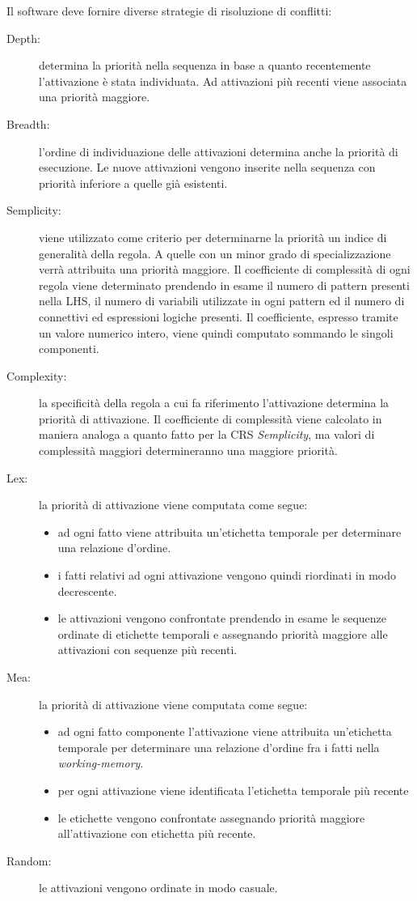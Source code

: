 Il software deve fornire diverse strategie di risoluzione di conflitti:
\begin{description}
	\item[Depth:] determina la priorità nella sequenza in base a quanto recentemente l'attivazione è stata individuata. Ad attivazioni più recenti viene associata una priorità maggiore.
	\item[Breadth:] l'ordine di individuazione delle attivazioni determina anche la priorità di esecuzione. Le nuove attivazioni vengono inserite nella sequenza con priorità inferiore a quelle già esistenti.
	\item[Semplicity:] viene utilizzato come criterio per determinarne la priorità un indice di generalità della regola. A quelle con un minor grado di specializzazione verrà attribuita una priorità maggiore. Il coefficiente di complessità di ogni regola viene determinato prendendo in esame il numero di pattern presenti nella LHS, il numero di variabili utilizzate in ogni pattern ed il numero di connettivi ed espressioni logiche presenti. Il coefficiente, espresso tramite un valore numerico intero, viene quindi computato sommando le singoli componenti.
	\item[Complexity:] la specificità della regola a cui fa riferimento l'attivazione determina la priorità di attivazione. Il coefficiente di complessità viene calcolato in maniera analoga a quanto fatto per la CRS \emph{Semplicity}, ma valori di complessità maggiori determineranno una maggiore priorità.
	\item[Lex:] la priorità di attivazione viene computata come segue:
		\begin{itemize}
			\item ad ogni fatto viene attribuita un'etichetta temporale per determinare una relazione d'ordine.
			\item i fatti relativi ad ogni attivazione vengono quindi riordinati in modo decrescente.
			\item le attivazioni vengono confrontate prendendo in esame le sequenze ordinate di etichette temporali e assegnando priorità maggiore alle attivazioni con sequenze più recenti.
		\end{itemize}
	\item[Mea:] la priorità di attivazione viene computata come segue:
		\begin{itemize}
			\item ad ogni fatto componente l'attivazione viene attribuita un'etichetta temporale per determinare una relazione d'ordine fra i fatti nella \emph{working-memory}.
			\item per ogni attivazione viene identificata l'etichetta temporale più recente
			\item le etichette vengono confrontate assegnando priorità maggiore all'attivazione con etichetta più recente.
		\end{itemize}
	\item[Random:] le attivazioni vengono ordinate in modo casuale.
\end{description}

